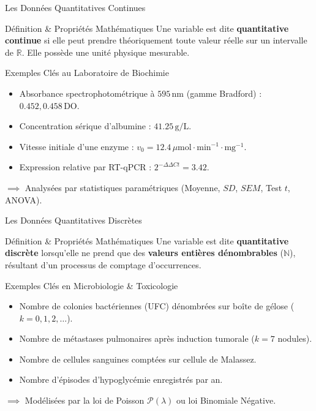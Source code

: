 \documentclass[aspectratio=169,10pt]{beamer}
\begin{document}
\begin{frame}{Les Données Quantitatives Continues}
  \begin{conceptbox}{Définition \& Propriétés Mathématiques}
    Une variable est dite \textbf{quantitative continue} si elle peut prendre théoriquement toute valeur réelle sur un intervalle de $\mathbb{R}$. Elle possède une unité physique mesurable.
  \end{conceptbox}
  \vspace{1.5mm}
  \begin{biobox}{Exemples Clés au Laboratoire de Biochimie}
    \begin{itemize}\setlength{\itemsep}{1.5pt}
      \item Absorbance spectrophotométrique à $595\,\text{nm}$ (gamme Bradford) : $0.452, 0.458\,\text{DO}$.
      \item Concentration sérique d'albumine : $41.25\,\text{g/L}$.
      \item Vitesse initiale d'une enzyme : $v_0 = 12.4\,\mu\text{mol}\cdot\text{min}^{-1}\cdot\text{mg}^{-1}$.
      \item Expression relative par RT-qPCR : $2^{-\Delta\Delta Ct} = 3.42$.
    \end{itemize}
    $\implies$ Analysées par statistiques paramétriques (Moyenne, $SD$, $SEM$, Test $t$, ANOVA).
  \end{biobox}
\end{frame}

\begin{frame}{Les Données Quantitatives Discrètes}
  \begin{conceptbox}{Définition \& Propriétés Mathématiques}
    Une variable est dite \textbf{quantitative discrète} lorsqu'elle ne prend que des \textbf{valeurs entières dénombrables} ($\mathbb{N}$), résultant d'un processus de comptage d'occurrences.
  \end{conceptbox}
  \vspace{1.5mm}
  \begin{biobox}{Exemples Clés en Microbiologie \& Toxicologie}
    \begin{itemize}\setlength{\itemsep}{1.5pt}
      \item Nombre de colonies bactériennes (UFC) dénombrées sur boîte de gélose ($k = 0, 1, 2, \dots$).
      \item Nombre de métastases pulmonaires après induction tumorale ($k = 7$ nodules).
      \item Nombre de cellules sanguines comptées sur cellule de Malassez.
      \item Nombre d'épisodes d'hypoglycémie enregistrés par an.
    \end{itemize}
    $\implies$ Modélisées par la loi de Poisson $\mathcal{P}(\lambda)$ ou loi Binomiale Négative.
  \end{biobox}
\end{frame}
\end{document}
